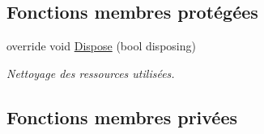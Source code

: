 \subsection*{Fonctions membres protégées}
\begin{DoxyCompactItemize}
\item 
override void \mbox{\hyperlink{class_m_t_connect_agent_1_1_form_main_a3d1ddf99b2318c689bd65eff1e863445}{Dispose}} (bool disposing)
\begin{DoxyCompactList}\small\item\em Nettoyage des ressources utilisées. \end{DoxyCompactList}\end{DoxyCompactItemize}
\subsection*{Fonctions membres privées}
